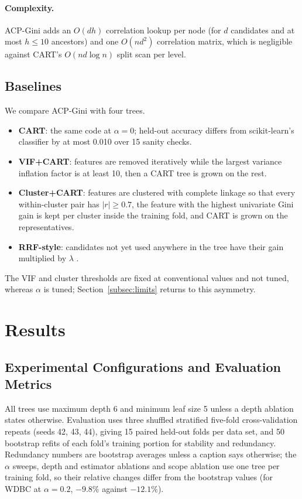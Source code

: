 \documentclass[pdflatex,sn-basic,Numbered]{sn-jnl}
\begin{document}
\paragraph{Complexity.} ACP-Gini adds an $O(dh)$ correlation lookup per node (for $d$ candidates and at most $h\le10$ ancestors) and one $O(nd^2)$ correlation matrix, which is negligible against CART's $O(nd\log n)$ split scan per level.

\subsection{Baselines}
We compare ACP-Gini with four trees.
\begin{itemize}
\item \textbf{CART}: the same code at $\alpha=0$; held-out accuracy differs from scikit-learn's classifier by at most 0.010 over 15 sanity checks.
\item \textbf{VIF+CART}: features are removed iteratively while the largest variance inflation factor is at least 10, then a CART tree is grown on the rest.
\item \textbf{Cluster+CART}: features are clustered with complete linkage so that every within-cluster pair has $|r|\ge0.7$, the feature with the highest univariate Gini gain is kept per cluster inside the training fold, and CART is grown on the representatives.
\item \textbf{RRF-style}: candidates not yet used anywhere in the tree have their gain multiplied by $\lambda$ \cite{deng2012rrf}.
\end{itemize}
The VIF and cluster thresholds are fixed at conventional values and not tuned, whereas $\alpha$ is tuned; Section~\ref{subsec:limits} returns to this asymmetry.

\section{Results}
\subsection{Experimental Configurations and Evaluation Metrics}
All trees use maximum depth 6 and minimum leaf size 5 unless a depth ablation states otherwise. Evaluation uses three shuffled stratified five-fold cross-validation repeats (seeds 42, 43, 44), giving 15 paired held-out folds per data set, and 50 bootstrap refits of each fold's training portion for stability and redundancy. Redundancy numbers are bootstrap averages unless a caption says otherwise; the $\alpha$ sweeps, depth and estimator ablations and scope ablation use one tree per training fold, so their relative changes differ from the bootstrap values (for WDBC at $\alpha=0.2$, $-9.8\%$ against $-12.1\%$).
\end{document}
